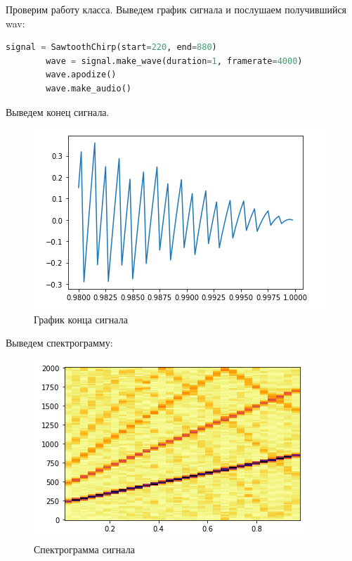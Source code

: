 \documentclass[a4paper, 14pt]{extarticle}
\begin{document}
    Проверим работу класса.
    Выведем график сигнала и послушаем получившийся wav:

    \begin{lstlisting}[language=Python, caption= Вывод графика и создание wav, label={lst:create_wav_plot}]
        signal = SawtoothChirp(start=220, end=880)
        wave = signal.make_wave(duration=1, framerate=4000)
        wave.apodize()
        wave.make_audio()
    \end{lstlisting}

    Выведем конец сигнала.

    \begin{figure}[H]
        \centering
        \includegraphics[width=0.8\linewidth]{sawtooth_chirp_signal_end}
        \caption{График конца сигнала}
        \label{fig:sawtooth_chirp_signal_end}
    \end{figure}

    Выведем спектрограмму:

    \begin{figure}[H]
        \centering
        \includegraphics[width=0.8\linewidth]{sawtooth_chirp_sp}
        \caption{Спектрограмма сигнала}
        \label{fig:sawtooth_chirp_sp}
    \end{figure}
\end{document}
